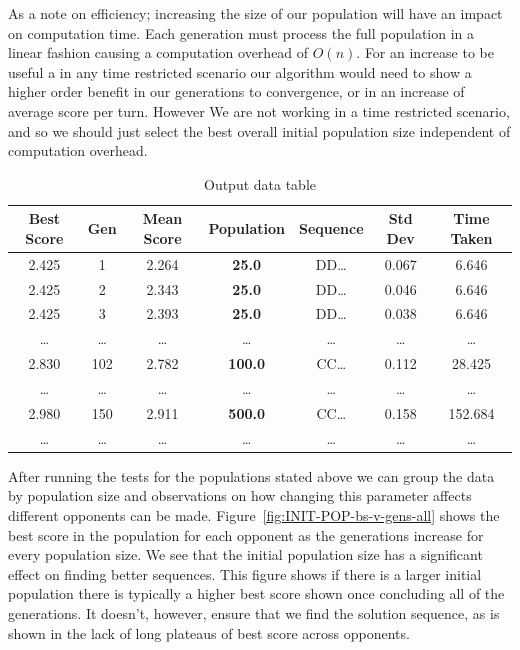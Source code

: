 As a note on efficiency; increasing the size of our population will have an impact on computation time.
Each generation must process the full population in a linear fashion causing a computation overhead of \(O(n)\).
For an increase to be useful a in any time restricted scenario our algorithm would need to show a higher order benefit in our generations to convergence, or in an increase of average score per turn.
However We are not working in a time restricted scenario, and so we should just select the best overall initial population size independent of computation overhead.

\begin{table}
    \centering
    \begin{tabular}{ccccccc}
        \toprule
        Best Score & Gen & Mean Score & Population & Sequence & Std Dev & Time Taken \\
        \midrule
        2.425 & 1 & 2.264 & \textbf{25.0} & DD\ldots & 0.067 & 6.646\\
        2.425 & 2 & 2.343 & \textbf{25.0} & DD\ldots & 0.046 & 6.646\\
        2.425 & 3 & 2.393 & \textbf{25.0} & DD\ldots & 0.038 & 6.646\\
        \ldots  & \ldots  & \ldots  & \ldots  & \ldots  & \ldots  & \ldots \\
        2.830 & 102 & 2.782 & \textbf{100.0} & CC\ldots & 0.112 & 28.425\\
        \ldots  & \ldots  & \ldots  & \ldots  & \ldots  & \ldots  & \ldots \\
        2.980 & 150 & 2.911 & \textbf{500.0} & CC\ldots & 0.158 & 152.684\\
        \ldots  & \ldots  & \ldots  & \ldots  & \ldots  & \ldots  & \ldots \\
        \bottomrule
    \end{tabular}
    \caption{Output data table}\label{table:popCheckerDataTable}
\end{table}

After running the tests for the populations stated above we can group the data by population size and observations on how changing this parameter affects different opponents can be made.
Figure~\ref{fig:INIT-POP-bs-v-gens-all} shows the best score in the population for each opponent as the generations increase for every population size.
We see that the initial population size has a significant effect on finding better sequences.
This figure shows if there is a larger initial population there is typically a higher best score shown once concluding all of the generations.
It doesn't, however, ensure that we find the solution sequence, as is shown in the lack of long plateaus of best score across opponents.

